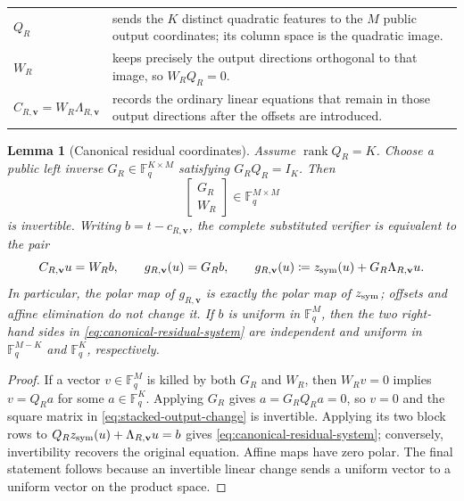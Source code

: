\documentclass[11pt]{article}
\newtheorem{lemma}[lemma]{Lemma}
\newcommand{\F}{\mathbb F}
\newcommand{\rank}{\operatorname{rank}}
\begin{document}
\begin{center}
\begin{tabularx}{0.92\textwidth}{@{}>{\bfseries}p{}X@{}}
$Q_R$ & sends the $K$ distinct quadratic features to the $M$ public output
coordinates; its column space is the quadratic image.\\
$W_R$ & keeps precisely the output directions orthogonal to that image, so
$W_R Q_R=0$.\\
$C_{R,\mathbf v}=W_R\Lambda_{R,\mathbf v}$ & records the ordinary linear equations that remain in
those output directions after the offsets are introduced.
\end{tabularx}
\end{center}

\begin{lemma}[Canonical residual coordinates]
\label{lem:canonical-residual-coordinates}
Assume $\rank Q_R=K$.  Choose a public left inverse
$G_R\in\F_q^{K\times M}$ satisfying $G_RQ_R=I_K$.  Then
\begin{equation}\label{eq:stacked-output-change}
 \begin{bmatrix}G_R\\ W_R\end{bmatrix}\in\F_q^{M\times M}
\end{equation}
is invertible.  Writing $b=t-c_{R,\mathbf v}$, the complete substituted
verifier is equivalent to the pair
\begin{equation}\label{eq:canonical-residual-system}
 C_{R,\mathbf v}u=W_Rb,
 \qquad
 g_{R,\mathbf v}(u)=G_Rb,
 \qquad
 g_{R,\mathbf v}(u)
   \coloneqq z_{\rm sym}(u)+G_R\Lambda_{R,\mathbf v}u.
\end{equation}
In particular, the polar map of $g_{R,\mathbf v}$ is exactly the polar map of
$z_{\rm sym}$; offsets and affine elimination do not change it.  If $b$ is
uniform in $\F_q^M$, then the two right-hand sides in
\eqref{eq:canonical-residual-system} are independent and uniform in
$\F_q^{M-K}$ and $\F_q^K$, respectively.
\end{lemma}

\begin{proof}
If a vector $v\in\F_q^M$ is killed by both $G_R$ and $W_R$, then
$W_Rv=0$ implies $v=Q_Ra$ for some $a\in\F_q^K$.  Applying $G_R$ gives
$a=G_RQ_Ra=0$, so $v=0$ and the square matrix in
\eqref{eq:stacked-output-change} is invertible.  Applying its two block rows
to $Q_Rz_{\rm sym}(u)+\Lambda_{R,\mathbf v}u=b$ gives
\eqref{eq:canonical-residual-system}; conversely, invertibility recovers the
original equation.  Affine maps have zero polar.  The final statement follows
because an invertible linear change sends a uniform vector to a uniform vector
on the product space.
\end{proof}
\end{document}
